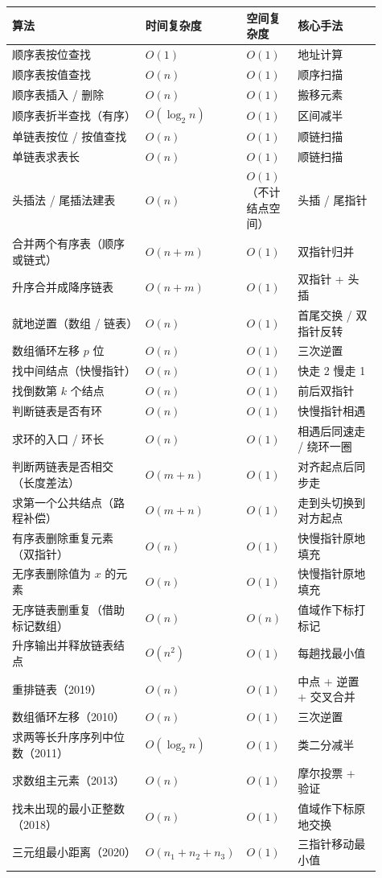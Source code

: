 \documentclass[11pt,openany,UTF8]{ctexbook}
\begin{document}
\begingroup\small\setlength{\tabcolsep}{4.0pt}
\begin{longtable}{@{}L{0.3875\linewidth}L{0.1400\linewidth}L{0.1400\linewidth}L{0.2438\linewidth}@{}}
\toprule
\textbf{算法} & \textbf{时间复杂度} & \textbf{空间复杂度} & \textbf{核心手法} \\
\midrule
\endhead
顺序表按位查找 & $O(1)$ & $O(1)$ & 地址计算 \\
顺序表按值查找 & $O(n)$ & $O(1)$ & 顺序扫描 \\
顺序表插入 / 删除 & $O(n)$ & $O(1)$ & 搬移元素 \\
顺序表折半查找（有序） & $O(\log_2 n)$ & $O(1)$ & 区间减半 \\
单链表按位 / 按值查找 & $O(n)$ & $O(1)$ & 顺链扫描 \\
单链表求表长 & $O(n)$ & $O(1)$ & 顺链扫描 \\
头插法 / 尾插法建表 & $O(n)$ & $O(1)$（不计结点空间） & 头插 / 尾指针 \\
合并两个有序表（顺序或链式） & $O(n+m)$ & $O(1)$ & 双指针归并 \\
升序合并成降序链表 & $O(n+m)$ & $O(1)$ & 双指针 + 头插 \\
就地逆置（数组 / 链表） & $O(n)$ & $O(1)$ & 首尾交换 / 双指针反转 \\
数组循环左移 $p$ 位 & $O(n)$ & $O(1)$ & 三次逆置 \\
找中间结点（快慢指针） & $O(n)$ & $O(1)$ & 快走 2 慢走 1 \\
找倒数第 $k$ 个结点 & $O(n)$ & $O(1)$ & 前后双指针 \\
判断链表是否有环 & $O(n)$ & $O(1)$ & 快慢指针相遇 \\
求环的入口 / 环长 & $O(n)$ & $O(1)$ & 相遇后同速走 / 绕环一圈 \\
判断两链表是否相交（长度差法） & $O(m+n)$ & $O(1)$ & 对齐起点后同步走 \\
求第一个公共结点（路程补偿） & $O(m+n)$ & $O(1)$ & 走到头切换到对方起点 \\
有序表删除重复元素（双指针） & $O(n)$ & $O(1)$ & 快慢指针原地填充 \\
无序表删除值为 $x$ 的元素 & $O(n)$ & $O(1)$ & 快慢指针原地填充 \\
无序链表删重复（借助标记数组） & $O(n)$ & $O(n)$ & 值域作下标打标记 \\
升序输出并释放链表结点 & $O(n^2)$ & $O(1)$ & 每趟找最小值 \\
重排链表（2019） & $O(n)$ & $O(1)$ & 中点 + 逆置 + 交叉合并 \\
数组循环左移（2010） & $O(n)$ & $O(1)$ & 三次逆置 \\
求两等长升序序列中位数（2011） & $O(\log_2 n)$ & $O(1)$ & 类二分减半 \\
求数组主元素（2013） & $O(n)$ & $O(1)$ & 摩尔投票 + 验证 \\
找未出现的最小正整数（2018） & $O(n)$ & $O(1)$ & 值域作下标原地交换 \\
三元组最小距离（2020） & $O(n_1+n_2+n_3)$ & $O(1)$ & 三指针移动最小值 \\
\bottomrule
\end{longtable}
\endgroup
\end{document}
